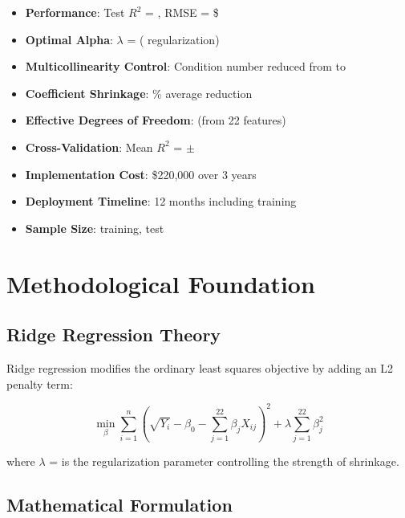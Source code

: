 \begin{itemize}
    \item \textbf{Performance}: Test $R^2$ = \ModelFourRSquaredTest, RMSE = \$\ModelFourRMSETest
    \item \textbf{Optimal Alpha}: $\lambda$ = \ModelFourAlpha{} (\ModelFourRegularizationStrength{} regularization)
    \item \textbf{Multicollinearity Control}: Condition number reduced from \ModelFourConditionNumberBefore{} to \ModelFourConditionNumberAfter{}
    \item \textbf{Coefficient Shrinkage}: \ModelFourShrinkageFactor{}\% average reduction
    \item \textbf{Effective Degrees of Freedom}: \ModelFourEffectiveDf{} (from 22 features)
    \item \textbf{Cross-Validation}: Mean $R^2$ = \ModelFourCVMean{} $\pm$ \ModelFourCVStd{}
    \item \textbf{Implementation Cost}: \$220,000 over 3 years
    \item \textbf{Deployment Timeline}: 12 months including training
    \item \textbf{Sample Size}: \ModelFourTrainingSamples{} training, \ModelFourTestSamples{} test
\end{itemize}

\section{Methodological Foundation}

\subsection{Ridge Regression Theory}

Ridge regression modifies the ordinary least squares objective by adding an L2 penalty term:

\begin{equation}
\min_{\beta} \sum_{i=1}^n \left(\sqrt{Y_i} - \beta_0 - \sum_{j=1}^{22} \beta_j X_{ij}\right)^2 + \lambda \sum_{j=1}^{22} \beta_j^2
\end{equation}

where $\lambda$ = \ModelFourAlpha{} is the regularization parameter controlling the strength of shrinkage.

\subsection{Mathematical Formulation}

